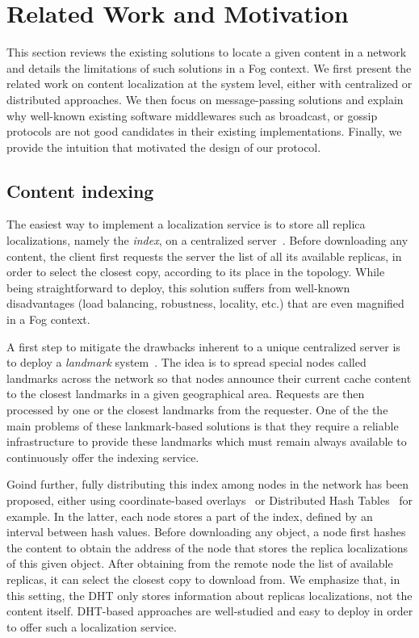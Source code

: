 
\section{Related Work and Motivation}
\label{sec:background}

This section reviews the existing solutions to locate a given content in a network and details the limitations 
of such solutions in a Fog context. We first present the related work on content localization at the system level, 
either with centralized or distributed approaches. We then focus on message-passing solutions and explain why well-known existing software middlewares such as broadcast, or gossip protocols are not good candidates in their existing implementations. Finally, we provide the intuition that motivated the design of our protocol.

\subsection*{Content indexing}

The easiest way to implement a localization service is to store all replica localizations, namely the \textit{index}, on a centralized server~\cite{fogstore, p2p-alto, p2p-oracle, snamp}. Before downloading any content, the client first requests the server the list of all its available replicas, in order to select the closest copy, according to its place in the topology. While being straightforward to deploy, this solution suffers from well-known disadvantages (load balancing, robustness, locality, etc.) that are even magnified in a Fog context.

A first step to mitigate the drawbacks inherent to a unique centralized server is to deploy a \textit{landmark} system~\cite{landmarks}. The idea is to spread special nodes called landmarks across the network so that nodes announce their current cache content to the closest landmarks in a given geographical area. Requests are then processed by one or the closest landmarks from the requester. One of the the main problems of these lankmark-based solutions is that they require a reliable infrastructure to provide these landmarks which must remain always available to continuously offer the indexing service.

Goind further, fully distributing this index among nodes in the network has been proposed, either using coordinate-based overlays~\cite{coin_19, voronet} or Distributed Hash Tables~\cite{squirrel, ipfs, dht-name-resolution, mdht} for example. In the latter, each node stores a part of the index, defined by an interval between hash values. 
Before downloading any object, a node first
hashes the content to obtain the address of the node that stores the replica localizations of this given object. After obtaining from the remote node the list of available replicas, it can select the closest copy to download from. We emphasize that, in this setting, the DHT only stores information about replicas localizations, not the content itself. DHT-based approaches are well-studied and easy to deploy in order to offer such a localization service. 

